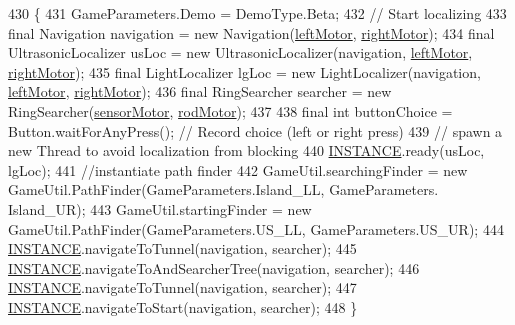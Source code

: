 \begin{DoxyCode}
430                                                   \{
431     GameParameters.Demo = DemoType.Beta;
432     \textcolor{comment}{// Start localizing}
433     \textcolor{keyword}{final} Navigation navigation = \textcolor{keyword}{new} Navigation(\hyperlink{enumca_1_1mcgill_1_1ecse211_1_1project_1_1_game_a7c673571bf50fdb6917a9d7bb671e003}{leftMotor}, \hyperlink{enumca_1_1mcgill_1_1ecse211_1_1project_1_1_game_a7a05fcf37c4435c32270776a427ba0d2}{rightMotor});
434     \textcolor{keyword}{final} UltrasonicLocalizer usLoc = \textcolor{keyword}{new} UltrasonicLocalizer(navigation, 
      \hyperlink{enumca_1_1mcgill_1_1ecse211_1_1project_1_1_game_a7c673571bf50fdb6917a9d7bb671e003}{leftMotor}, \hyperlink{enumca_1_1mcgill_1_1ecse211_1_1project_1_1_game_a7a05fcf37c4435c32270776a427ba0d2}{rightMotor});
435     \textcolor{keyword}{final} LightLocalizer lgLoc = \textcolor{keyword}{new} LightLocalizer(navigation, \hyperlink{enumca_1_1mcgill_1_1ecse211_1_1project_1_1_game_a7c673571bf50fdb6917a9d7bb671e003}{leftMotor}, 
      \hyperlink{enumca_1_1mcgill_1_1ecse211_1_1project_1_1_game_a7a05fcf37c4435c32270776a427ba0d2}{rightMotor});
436     \textcolor{keyword}{final} RingSearcher searcher = \textcolor{keyword}{new} RingSearcher(\hyperlink{enumca_1_1mcgill_1_1ecse211_1_1project_1_1_game_aa94b85dc88de85d959677bd6c0f98989}{sensorMotor}, 
      \hyperlink{enumca_1_1mcgill_1_1ecse211_1_1project_1_1_game_abc070af2fa5a5cda6d81977b35aacfb4}{rodMotor});
437     
438     \textcolor{keyword}{final} \textcolor{keywordtype}{int} buttonChoice = Button.waitForAnyPress(); \textcolor{comment}{// Record choice (left or right press)}
439     \textcolor{comment}{// spawn a new Thread to avoid localization from blocking}
440         \hyperlink{enumca_1_1mcgill_1_1ecse211_1_1project_1_1_game_a6584b6534b14ba43dc1444084a925a20}{INSTANCE}.ready(usLoc, lgLoc);
441         \textcolor{comment}{//instantiate path finder}
442         GameUtil.searchingFinder = \textcolor{keyword}{new} GameUtil.PathFinder(GameParameters.Island\_LL, GameParameters.
      Island\_UR);
443         GameUtil.startingFinder = \textcolor{keyword}{new} GameUtil.PathFinder(GameParameters.US\_LL, GameParameters.US\_UR);
444         \hyperlink{enumca_1_1mcgill_1_1ecse211_1_1project_1_1_game_a6584b6534b14ba43dc1444084a925a20}{INSTANCE}.navigateToTunnel(navigation, searcher);
445         \hyperlink{enumca_1_1mcgill_1_1ecse211_1_1project_1_1_game_a6584b6534b14ba43dc1444084a925a20}{INSTANCE}.navigateToAndSearcherTree(navigation, searcher);
446         \hyperlink{enumca_1_1mcgill_1_1ecse211_1_1project_1_1_game_a6584b6534b14ba43dc1444084a925a20}{INSTANCE}.navigateToTunnel(navigation, searcher);
447         \hyperlink{enumca_1_1mcgill_1_1ecse211_1_1project_1_1_game_a6584b6534b14ba43dc1444084a925a20}{INSTANCE}.navigateToStart(navigation, searcher);
448   \}
\end{DoxyCode}



